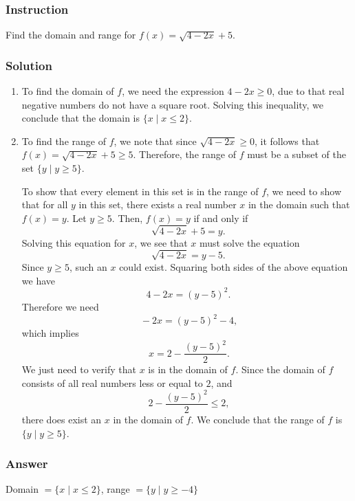 \documentclass[12pt, letterpaper, oneside]{memoir}
\begin{document}
\subsubsection*{Instruction}

Find the domain and range for $ f(x) = \sqrt{4 - 2x} + 5 $.

\subsubsection*{Solution}

\begin{enumerate}[label=\roman*]
  \item To find the domain of $ f $, we need the expression $ 4 - 2x \ge 0 $, due to that real negative numbers do not have a square root. Solving this inequality, we conclude that the domain is $ \{ x \mid x \le 2 \} $.
  \item To find the range of $ f $, we note that since $ \sqrt{4 - 2x} \ge 0 $, it follows that $ f(x) = \sqrt{4 - 2x} + 5 \ge 5 $. Therefore, the range of $ f $ must be a subset of the set $ \{ y \mid y \ge 5 \} $.

    To show that every element in this set is in the range of $ f $, we need to show that for all $ y $ in this set, there exists a real number $ x $ in the domain such that $ f(x) = y $. Let $ y \ge 5 $. Then, $ f(x) = y $ if and only if
    $$ \phantom{.}
    \sqrt{4 - 2x} + 5 = y
    .$$
    Solving this equation for $ x $, we see that $ x $ must solve the equation
    $$ \phantom{.}
    \sqrt{4 - 2x}= y - 5
    .$$
    Since $ y \ge 5 $, such an $ x $ could exist. Squaring both sides of the above equation we have
    $$ \phantom{.}
    4-2x = (y - 5)^2
    .$$
    Therefore we need
    $$ \phantom{,}
    -2x= (y - 5)^2 - 4
    ,$$
    which implies
    $$ \phantom{,}
    x= 2 -\frac{(y - 5)^2}{2}
    .$$
    We just need to verify that $ x $ is in the domain of $ f $. Since the domain of $ f $ consists of all real numbers less or equal to $ 2 $, and
    $$ \phantom{,}
    2 -\frac{(y - 5)^2}{2} \le 2
    ,$$
    there does exist an $ x $ in the domain of $ f $. We conclude that the range of $ f $ is $ \{ y \mid y \ge 5 \} $.
\end{enumerate}

\subsubsection*{Answer}

Domain $ = \{ x \mid x \le 2 \} $, range $ = \{ y \mid y \ge -4 \} $
\end{document}
